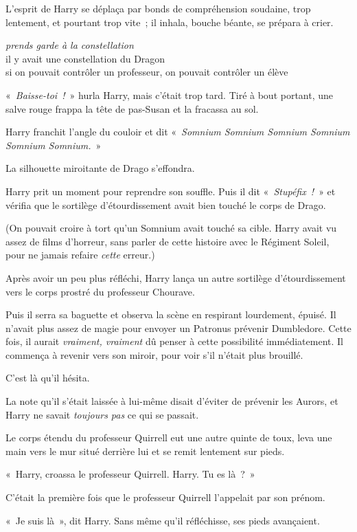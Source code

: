 L'esprit de Harry se déplaça par bonds de compréhension soudaine, trop lentement, et pourtant trop vite~; il inhala, bouche béante, se prépara à crier.

\emph{prends garde à la constellation}\\ il y avait une constellation du Dragon\\ si on pouvait contrôler un professeur, on pouvait contrôler un élève

«~\emph{Baisse-toi~!}~» hurla Harry, mais c'était trop tard.
Tiré à bout portant, une salve rouge frappa la tête de pas-Susan et la fracassa au sol.

Harry franchit l'angle du couloir et dit «~\emph{Somnium Somnium Somnium Somnium Somnium Somnium.}~»

La silhouette miroitante de Drago s'effondra.

Harry prit un moment pour reprendre son souffle.
Puis il dit «~\emph{Stupéfix~!}~» et vérifia que le sortilège d'étourdissement avait bien touché le corps de Drago.

(On pouvait croire à tort qu'un Somnium avait touché sa cible.
Harry avait vu assez de films d'horreur, sans parler de cette histoire avec le Régiment Soleil, pour ne jamais refaire \emph{cette} erreur.)

Après avoir un peu plus réfléchi, Harry lança un autre sortilège d'étourdissement vers le corps prostré du professeur Chourave.

Puis il serra sa baguette et observa la scène en respirant lourdement, épuisé.
Il n'avait plus assez de magie pour envoyer un Patronus prévenir Dumbledore.
Cette fois, il aurait \emph{vraiment, vraiment} dû penser à cette possibilité immédiatement.
Il commença à revenir vers son miroir, pour voir s'il n'était plus brouillé.

C'est là qu'il hésita.

La note qu'il s'était laissée à lui-même disait d'éviter de prévenir les Aurors, et Harry ne savait \emph{toujours pas} ce qui se passait.

Le corps étendu du professeur Quirrell eut une autre quinte de toux, leva une main vers le mur situé derrière lui et se remit lentement sur pieds.

«~Harry, croassa le professeur Quirrell.
Harry. Tu es là~?~»

C'était la première fois que le professeur Quirrell l'appelait par son prénom.

«~Je suis là~», dit Harry.
Sans même qu'il réfléchisse, ses pieds avançaient.

